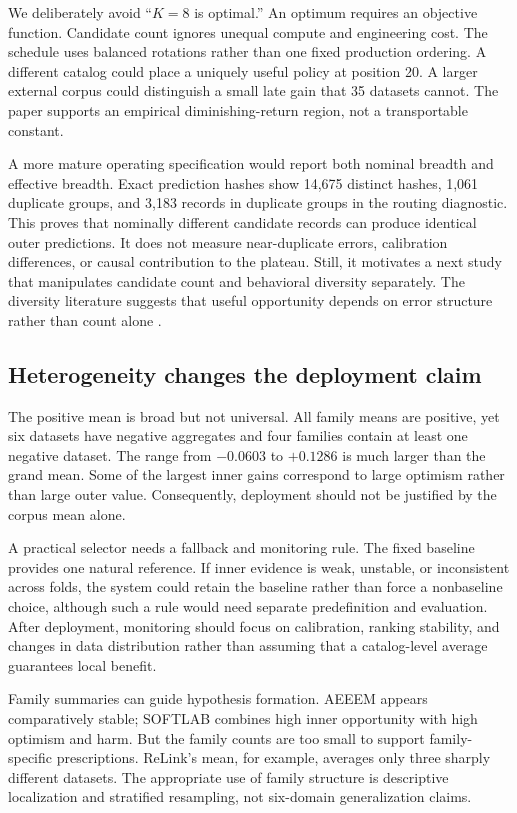 \documentclass[referee]{USG}
\begin{document}
We deliberately avoid ``$K=8$ is optimal.'' An optimum requires an objective function. Candidate count ignores unequal compute and engineering cost. The schedule uses balanced rotations rather than one fixed production ordering. A different catalog could place a uniquely useful policy at position 20. A larger external corpus could distinguish a small late gain that 35 datasets cannot. The paper supports an empirical diminishing-return region, not a transportable constant.

A more mature operating specification would report both nominal breadth and effective breadth. Exact prediction hashes show 14,675 distinct hashes, 1,061 duplicate groups, and 3,183 records in duplicate groups in the routing diagnostic. This proves that nominally different candidate records can produce identical outer predictions. It does not measure near-duplicate errors, calibration differences, or causal contribution to the plateau. Still, it motivates a next study that manipulates candidate count and behavioral diversity separately. The diversity literature suggests that useful opportunity depends on error structure rather than count alone \cite{osei2025diversity}.

\subsection{Heterogeneity changes the deployment claim}
The positive mean is broad but not universal. All family means are positive, yet six datasets have negative aggregates and four families contain at least one negative dataset. The range from $-0.0603$ to $+0.1286$ is much larger than the grand mean. Some of the largest inner gains correspond to large optimism rather than large outer value. Consequently, deployment should not be justified by the corpus mean alone.

A practical selector needs a fallback and monitoring rule. The fixed baseline provides one natural reference. If inner evidence is weak, unstable, or inconsistent across folds, the system could retain the baseline rather than force a nonbaseline choice, although such a rule would need separate predefinition and evaluation. After deployment, monitoring should focus on calibration, ranking stability, and changes in data distribution rather than assuming that a catalog-level average guarantees local benefit.

Family summaries can guide hypothesis formation. AEEEM appears comparatively stable; SOFTLAB combines high inner opportunity with high optimism and harm. But the family counts are too small to support family-specific prescriptions. ReLink's mean, for example, averages only three sharply different datasets. The appropriate use of family structure is descriptive localization and stratified resampling, not six-domain generalization claims.
\end{document}
